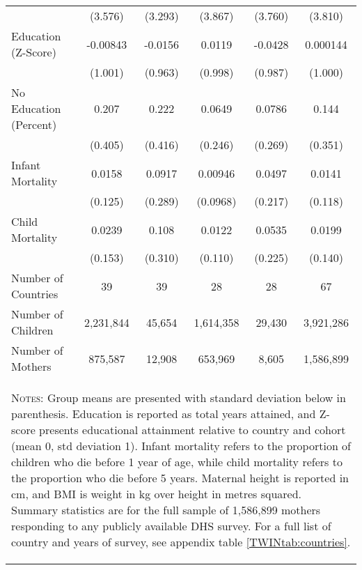\begin{table}[htpb!]
\begin{center}
{\begin{tabular}{lccccc}
&(3.576)&(3.293)&(3.867)&(3.760)&(3.810)\\
Education (Z-Score)&-0.00843&-0.0156&0.0119&-0.0428&0.000144\\
&(1.001)&(0.963)&(0.998)&(0.987)&(1.000)\\
No Education (Percent)&0.207&0.222&0.0649&0.0786&0.144\\
&(0.405)&(0.416)&(0.246)&(0.269)&(0.351)\\
Infant Mortality&0.0158&0.0917&0.00946&0.0497&0.0141\\
&(0.125)&(0.289)&(0.0968)&(0.217)&(0.118)\\
Child Mortality&0.0239&0.108&0.0122&0.0535&0.0199\\
&(0.153)&(0.310)&(0.110)&(0.225)&(0.140)\\
\midrule
Number of Countries & 39&39  & 28&28  & 67 \\
Number of Children &2,231,844 &45,654 &1,614,358 &29,430 & 3,921,286 \\
Number of Mothers &875,587 &12,908 &653,969 &8,605 & 1,586,899 \\
\midrule
\multicolumn{6}{p{13.2cm}}{\begin{footnotesize}\textsc{Notes:}  Group means are presented with standard deviation below in parenthesis.  Education is reported as total years attained, and Z-score presents educational attainment relative to country and cohort (mean 0, std deviation 1).  Infant mortality refers to the proportion of children who die before 1 year of age,  while child mortality refers to the proportion who die before 5 years.  Maternal height is reported in cm, and BMI is weight in kg over height in metres squared.  Summary statistics are for the full sample of 1,586,899
 mothers responding to any publicly available DHS survey.  For a full list of country and years of survey, see appendix table \ref{TWINtab:countries}.\end{footnotesize}} \\ \bottomrule \end{tabular}}\end{center}\end{table}